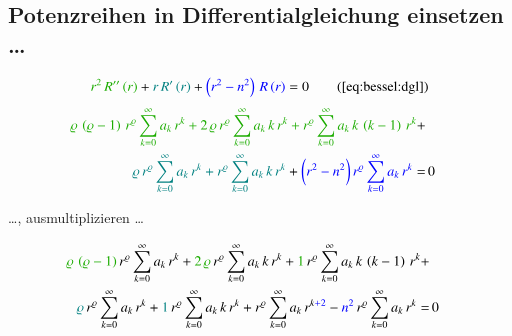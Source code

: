 \subsection[Potenzreihen in Differentialgleichung \refeq{eq:bessel:dgl} einsetzen]{Potenzreihen in Differentialgleichung  einsetzen \dots}
%

\begin{align*}
	\textcolor{mygreen}{r^2 \, R'' \left( r \right)}
	+
	\textcolor{teal}{r \, R' \left( r \right)}
	+
	\textcolor{blue}{\left( r^2 - n^2 \right) \, R \left( r \right)}
	=
	0
	\tag{\ref{eq:bessel:dgl}}
\end{align*}
%
\begin{align*}	
	\textcolor{mygreen}{
		\varrho \, \left( \varrho - 1 \right) \, r^{\varrho}
		\sum_{k=0}^{\infty} a_k \, r^k
		+
		2 \, \varrho \, r^{\varrho}
		\sum_{k=0}^{\infty} a_k \, k \, r^k
		+
		r^{\varrho}
		\sum_{k=0}^{\infty} a_k \, k \, \left( k - 1 \right) \, r^k
	}
	+ \\
	\textcolor{teal}{
		\varrho \, r^{\varrho}
		\sum_{k=0}^{\infty} a_k \, r^k
		+
		r^{\varrho}
		\sum_{k=0}^{\infty} a_k \, k \, r^k
	}
	+ 
	\textcolor{blue}{
		\biggl(
		r^2 - n^2
		\biggr) \,
		r^{\varrho}
		\sum_{k=0}^{\infty} a_k \, r^k
	}
	= & \, 0
\end{align*}
\begin{normalsize}
	\dots , ausmultiplizieren \dots
\end{normalsize}
\begin{align*}
	\textcolor{mygreen}{	\varrho \, \left( \varrho - 1 \right)} 
	\, r^{\varrho}
	\sum_{k=0}^{\infty} a_k \, r^k
	+
	\textcolor{mygreen}{2 \, \varrho}
	\, r^{\varrho}
	\sum_{k=0}^{\infty} a_k \, k \, r^k
	+
	\textcolor{mygreen}{1}
	\, r^{\varrho}
	\sum_{k=0}^{\infty} a_k \, k \, \left( k - 1 \right) \, r^k
	+ \\
	\textcolor{teal}{\varrho}
	\, r^{\varrho}
	\sum_{k=0}^{\infty} a_k \, r^k
	+
	\textcolor{teal}{1}
	\, r^{\varrho}
	\sum_{k=0}^{\infty} a_k \, k \, r^k
	+ 
	r^{\varrho}
		\sum_{k=0}^{\infty} a_k \, r^{k \textcolor{blue}{+ 2}}
	-
	\textcolor{blue}{n^2}
	\, r^{\varrho}
	\sum_{k=0}^{\infty} a_k \, r^k
	= & \, 0
\end{align*}
